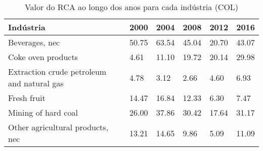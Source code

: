 \begin{table}
\centering
\caption{Valor do RCA ao longo dos anos para cada indústria (COL)}
\begin{tabular}{p{6cm}p{1.5cm}p{1.5cm}p{1.5cm}p{1.5cm}p{1.5cm}}
\toprule
                                 Indústria &  2000 &  2004 &  2008 &  2012 &  2016 \\
\midrule
                            Beverages, nec & 50.75 & 63.54 & 45.04 & 20.70 & 43.07 \\
                        Coke oven products &  4.61 & 11.10 & 19.72 & 20.14 & 29.98 \\
Extraction crude petroleum and natural gas &  4.78 &  3.12 &  2.66 &  4.60 &  6.93 \\
                               Fresh fruit & 14.47 & 16.84 & 12.33 &  6.30 &  7.47 \\
                       Mining of hard coal & 26.00 & 37.86 & 30.42 & 17.64 & 31.17 \\
          Other agricultural products, nec & 13.21 & 14.65 &  9.86 &  5.09 & 11.09 \\
\bottomrule
\end{tabular}
\end{table}
